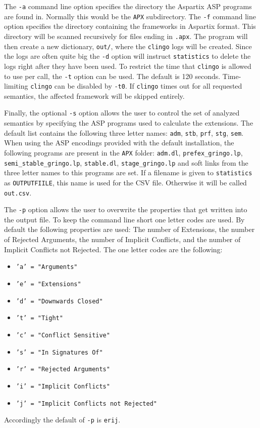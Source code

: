 \documentclass[parskip=half]{scrartcl}
\begin{document}
The \texttt{-a} command line option specifies the directory the Aspartix ASP
programs are found in. Normally this would be the \texttt{APX\/} subdirectory.
The \texttt{-f} command line
option specifies the directory containing the frameworks in Aspartix format.
This directory will be scanned recursively for files ending
in \texttt{.apx}. The program will then create a new
dictionary, \texttt{out/}, where the \texttt{clingo} logs will be created.
Since the logs are often quite big the \texttt{-d} option will instruct
\texttt{statistics} to delete the logs right after they have been used.
To restrict the time that \texttt{clingo} is allowed to use per call, the
\texttt{-t} option can be used. The default is 120 seconds. Time-limiting
\texttt{clingo} can be disabled by \texttt{-t0}.
If \texttt{clingo} times out for all requested semantics, the affected
framework will be skipped entirely.

Finally, the optional \texttt{-s} option allows the user to control the
set of analyzed semantics by specifying the ASP programs used to calculate the extensions.
The default list contains the following three letter names:
\texttt{adm}, \texttt{stb}, \texttt{prf}, \texttt{stg}, \texttt{sem}.
When using the ASP encodings provided with the default installation,
the following programs are present in the \texttt{APX\/} folder: \texttt{adm.dl},
\texttt{prefex\_gringo.lp}, \texttt{semi\_stable\_gringo.lp},
\texttt{stable.dl}, \texttt{stage\_gringo.lp} and soft links from the three letter
names to this programs are set.
If a filename is given to \texttt{statistics} as \texttt{OUTPUTFIILE}, this name is used for the CSV file.
Otherwise it will be called \texttt{out.csv}.

The \texttt{-p} option allows the user to overwrite the properties that
get written into the output file. To keep the command line short one
letter codes are used.
By default the following properties are used: The number
of Extensions, the number of Rejected Arguments, the number of Implicit
Conflicts, and the number of Implicit Conflicts not Rejected.
The one letter codes are the following:
\begin{itemize}
	\item \texttt{'a' = "Arguments"}
	\item \texttt{'e' = "Extensions"}
	\item \texttt{'d' = "Downwards Closed"}
	\item \texttt{'t' = "Tight"}
	\item \texttt{'c' = "Conflict Sensitive"}
	\item \texttt{'s' = "In Signatures Of"}
	\item \texttt{'r' = "Rejected Arguments"}
	\item \texttt{'i' = "Implicit Conflicts"}
	\item \texttt{'j' = "Implicit Conflicts not Rejected"}
\end{itemize}
Accordingly the default of \texttt{-p} is \texttt{erij}.
\end{document}
